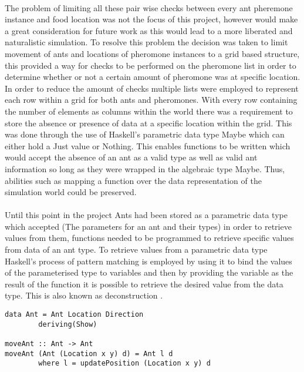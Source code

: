 \documentclass[main.tex]{subfiles}
\begin{document}
\paragraph{}The problem of limiting all these pair wise checks between every ant pheremone instance and food location was not the focus of this project, however would make a great consideration for future work as this would lead to a more liberated and naturalistic simulation. To resolve this problem the decision was taken to limit movement of ants and locations of pheromone instances to a grid based structure, this provided a way for checks to be performed on the pheromone list  in order to determine whether or not a certain amount of pheromone was at specific location. In order to reduce the amount of checks multiple lists were employed to represent each row within a grid for both ants and pheromones. With every row containing the number of elements as columns within the world there was a requirement to store the absence or presence of data at a specific location within the grid. This was done through the use of Haskell's parametric data type Maybe which can either hold a Just value or Nothing. This enables functions to be written which would accept the absence of an ant as a valid type as well as valid ant information so long as they were wrapped in the algebraic type Maybe. Thus, abilities such as mapping a function over the data representation of the simulation world could be preserved.

\paragraph{}Until this point in the project Ants had been stored as a parametric data type which accepted (The parameters for an ant and their types) in order to retrieve values from them, functions needed to be programmed to retrieve specific values from data of an ant type. To retrieve values from a parametric data type Haskell's process of pattern matching is employed by using it to bind the values of the parameterised type to variables and  then by providing the variable as the result of the function it is possible to retrieve the desired value from the data type. This is also known as deconstruction \cite{Lipovaca2010}.

\begin{lstlisting}
data Ant = Ant Location Direction
        deriving(Show)

moveAnt :: Ant -> Ant
moveAnt (Ant (Location x y) d) = Ant l d
        where l = updatePosition (Location x y) d
\end{lstlisting}
\end{document}
